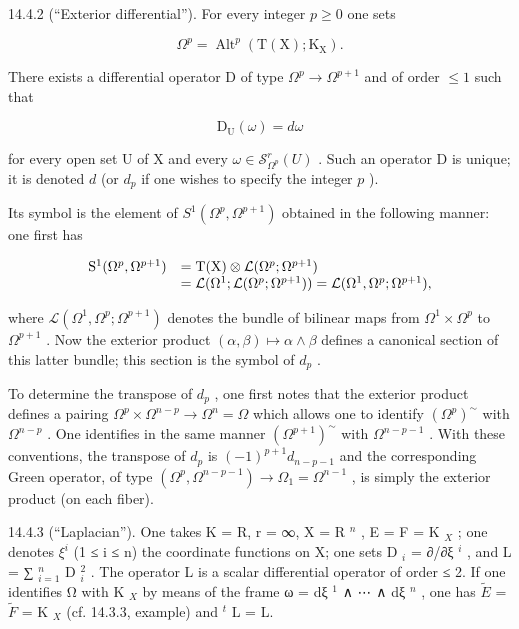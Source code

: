 14.4.2 (“Exterior differential”). For every integer \(p \geqslant 0\) one sets

\[
\Omega^ {p} = \operatorname{Alt} ^ {p} (\mathrm{T} (\mathrm{X}); \mathrm{K} _ {\mathrm{X}}).
\]

There exists a differential operator D of type \(\Omega^{p} \to \Omega^{p+1}\) and of order \(\leqslant 1\) such that

\[
\mathrm{D} _ {\mathrm{U}} (\omega) = d \omega
\]

for every open set U of X and every \(\omega\in\mathcal{S}_{\Omega^{p}}^{r}(U)\) . Such an operator D is unique; it is denoted \(d\) (or \(d_{p}\) if one wishes to specify the integer \(p\) ).

Its symbol is the element of \(S^1(\Omega^p, \Omega^{p+1})\) obtained in the following manner: one first has

\[
\begin{array}{r l} \mathrm{S} ^ {1} (\Omega^ {p}, \Omega^ {p + 1}) & = \mathrm{T} (\mathrm{X}) \otimes \mathcal {L} (\Omega^ {p}; \Omega^ {p + 1}) \\ & = \mathcal {L} (\Omega^ {1}; \mathcal {L} (\Omega^ {p}; \Omega^ {p + 1})) = \mathcal {L} (\Omega^ {1}, \Omega^ {p}; \Omega^ {p + 1}), \end{array}
\]

where \(\mathcal{L}(\Omega^{1},\Omega^{p};\Omega^{p+1})\) denotes the bundle of bilinear maps from \(\Omega^{1}\times\Omega^{p}\) to \(\Omega^{p+1}\) . Now the exterior product \((\alpha,\beta)\mapsto\alpha\wedge\beta\) defines a canonical section of this latter bundle; this section is the symbol of \(d_{p}\) .

To determine the transpose of \(d_{p}\) , one first notes that the exterior product defines a pairing \(\Omega^{p} \times \Omega^{n-p} \to \Omega^{n} = \Omega\) which allows one to identify \((\Omega^{p})^{\sim}\) with \(\Omega^{n-p}\) . One identifies in the same manner \((\Omega^{p+1})^{\sim}\) with \(\Omega^{n-p-1}\) . With these conventions, the transpose of \(d_{p}\) is \((-1)^{p+1}d_{n-p-1}\) and the corresponding Green operator, of type \((\Omega^{p}, \Omega^{n-p-1}) \to \Omega_{1} = \Omega^{n-1}\) , is simply the exterior product (on each fiber).

14.4.3 (“Laplacian”). One takes K = R, r = ∞, X = R \(^{n}\) , E = F = K \(_{X}\) ; one denotes \(\xi^{i}\) (1 ≤ i ≤ n) the coordinate functions on X; one sets D \(_{i}\) = ∂/∂ξ \(^{i}\) , and L = ∑ \(_{i=1}^{n}\) D \(_{i}^{2}\) . The operator L is a scalar differential operator of order ≤ 2. If one identifies Ω with K \(_{X}\) by means of the frame ω = dξ \(^{1}\) ∧ ⋯ ∧ dξ \(^{n}\) , one has \(\tilde{E}\) = \(\tilde{F}\) = K \(_{X}\) (cf. 14.3.3, example) and \(^{t}\) L = L.

